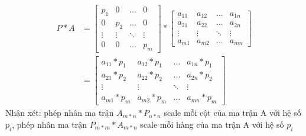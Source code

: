 \documentclass[a4paper,11pt]{article}
\theoremstyle{mytheor}
\begin{document}
\begin{align}
    \nonumber P*A &= \begin{bmatrix} p_1 & 0 & \hdots & 0\\
                        0 & p_2 & \hdots & 0 \\
                        \vdots & \vdots & \ddots & \vdots \\
                        0 & 0 & \hdots & p_m
                        \end{bmatrix}
        * \begin{bmatrix} a_{11} & a_{12} & \hdots & a_{1n} \\ 
                        a_{21} & a_{22} & \hdots & a_{2n} \\
                        \vdots & \vdots & \ddots & \vdots \\
                        a_{m1} & a_{m2} & \hdots & a_{mn}
                        \end{bmatrix}
        \\
    \nonumber     &= \begin{bmatrix} a_{11}*p_1 & a_{12}*p_1 & \hdots & a_{1n}*p_1 \\ 
                        a_{21}*p_2 & a_{22}*p_2 & \hdots & a_{2n}*p_2 \\
                        \vdots & \vdots & \ddots & \vdots \\
                        a_{m1}*p_m & a_{m2}*p_m & \hdots & a_{mn}*p_m
                        \end{bmatrix}
\end{align}
Nhận xét: phép nhân ma trận $A_{m*n}*P_{n*n}$ scale mỗi cột của ma trận A với hệ số $p_i$, phép nhân ma trận $P_{m*m}*A_{m*n}$ scale mỗi hàng của ma trận A với hệ số $p_i$
\end{document}
